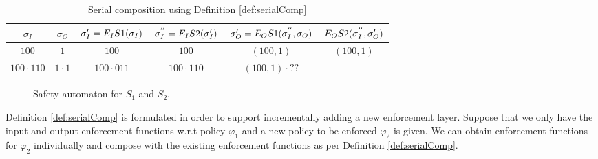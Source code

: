 \begin{table}
	\centering
	\begin{tabular}{|c|c|c|c|c|c|}
		\hline
		$\sigma_I$ & $\sigma_O$ & $\sigma'_I = E_{I}{S1}(\sigma_I)$ & $\sigma^{''}_I = E_{I}{S2}(\sigma'_I)$ & $ \sigma'_O = E_{O}{S1}(\sigma^{''}_I, \sigma_O)$ & $E_{O}{S2}(\sigma^{''}_I, \sigma'_O)$ \\
		\hline
		$100$ & $1$ & $100$ & $100$ &  $(100,1)$ & $(100,1)$ \\
		\hline
		$100 \cdot 110$ & $1 \cdot 1 $ & $100 \cdot 011$ & $100 \cdot 110$ &  $(100,1) \cdot ??$ & -- \\
		
		\hline
	\end{tabular}
	\caption{Serial composition using Definition \ref{def:serialComp}}
	\label{tableEgSerialDef}
\end{table}
\begin{figure}
	\centering
	\centering
	\hspace{0.1em}
	\caption{Safety automaton for $S_1$ and $S_2$.}
	\label{fig:prop1&2-duplicate}
\end{figure}
\begin{remark}
	
	Definition \ref{def:serialComp} is formulated in order to support incrementally adding a new enforcement layer. Suppose that we only have the input and output enforcement functions w.r.t policy $\varphi_1$ and a new policy to be enforced $\varphi_2$ is given. 
	We can obtain enforcement functions for $\varphi_2$ individually and compose with the existing enforcement functions as per Definition \ref{def:serialComp}.
	
\end{remark}

